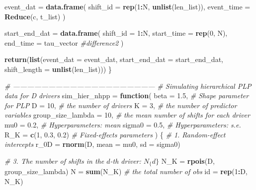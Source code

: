 \documentclass[
]{article}
\newenvironment{Shaded}{\begin{snugshade}}{\end{snugshade}}
\newcommand{\CommentTok}[1]{\textcolor[rgb]{0.56,0.35,0.01}{\textit{#1}}}
\newcommand{\ControlFlowTok}[1]{\textcolor[rgb]{0.13,0.29,0.53}{\textbf{#1}}}
\newcommand{\DataTypeTok}[1]{\textcolor[rgb]{0.13,0.29,0.53}{#1}}
\newcommand{\DecValTok}[1]{\textcolor[rgb]{0.00,0.00,0.81}{#1}}
\newcommand{\FloatTok}[1]{\textcolor[rgb]{0.00,0.00,0.81}{#1}}
\newcommand{\KeywordTok}[1]{\textcolor[rgb]{0.13,0.29,0.53}{\textbf{#1}}}
\newcommand{\NormalTok}[1]{#1}
\newcommand{\OperatorTok}[1]{\textcolor[rgb]{0.81,0.36,0.00}{\textbf{#1}}}
\newcommand{\StringTok}[1]{\textcolor[rgb]{0.31,0.60,0.02}{#1}}
\begin{document}
\begin{Shaded}
\begin{Highlighting}[]
\NormalTok{  event_dat =}\StringTok{ }\KeywordTok{data.frame}\NormalTok{(}
    \DataTypeTok{shift_id =} \KeywordTok{rep}\NormalTok{(}\DecValTok{1}\OperatorTok{:}\NormalTok{N, }\KeywordTok{unlist}\NormalTok{(len_list)),}
    \DataTypeTok{event_time =} \KeywordTok{Reduce}\NormalTok{(c, t_list)}
\NormalTok{  )}

\NormalTok{  start_end_dat =}\StringTok{ }\KeywordTok{data.frame}\NormalTok{(}
    \DataTypeTok{shift_id =} \DecValTok{1}\OperatorTok{:}\NormalTok{N,}
    \DataTypeTok{start_time =} \KeywordTok{rep}\NormalTok{(}\DecValTok{0}\NormalTok{, N),}
    \DataTypeTok{end_time =}\NormalTok{ tau_vector }\CommentTok{#difference2}
\NormalTok{  )}

  \KeywordTok{return}\NormalTok{(}\KeywordTok{list}\NormalTok{(}\DataTypeTok{event_dat =}\NormalTok{ event_dat,}
              \DataTypeTok{start_end_dat =}\NormalTok{ start_end_dat,}
              \DataTypeTok{shift_length =} \KeywordTok{unlist}\NormalTok{(len_list)))}
\NormalTok{\}}

\CommentTok{# ------------------------------------------------------------}
\CommentTok{# Simulating hierarchical PLP data for D drivers}
\NormalTok{sim_hier_nhpp =}\StringTok{ }\ControlFlowTok{function}\NormalTok{(}
  \DataTypeTok{beta =} \FloatTok{1.5}\NormalTok{,             }\CommentTok{# Shape parameter for PLP}
  \DataTypeTok{D =} \DecValTok{10}\NormalTok{,                 }\CommentTok{# the number of drivers}
  \DataTypeTok{K =} \DecValTok{3}\NormalTok{,                  }\CommentTok{# the number of predictor variables}
  \DataTypeTok{group_size_lambda =} \DecValTok{10}\NormalTok{, }\CommentTok{# the mean number of shifts for each driver}
  \DataTypeTok{mu0 =} \FloatTok{0.2}\NormalTok{,              }\CommentTok{# Hyperparameters: mean}
  \DataTypeTok{sigma0 =} \FloatTok{0.5}\NormalTok{,           }\CommentTok{# Hyperparameters: s.e.}
  \DataTypeTok{R_K =} \KeywordTok{c}\NormalTok{(}\DecValTok{1}\NormalTok{, }\FloatTok{0.3}\NormalTok{, }\FloatTok{0.2}\NormalTok{)    }\CommentTok{# Fixed-effects parameters}
\NormalTok{)}
\NormalTok{\{}
  \CommentTok{# 1. Random-effect intercepts}
\NormalTok{  r_0D =}\StringTok{ }\KeywordTok{rnorm}\NormalTok{(D, }\DataTypeTok{mean =}\NormalTok{ mu0, }\DataTypeTok{sd =}\NormalTok{ sigma0)}

  \CommentTok{# 3. The number of shifts in the $d$-th driver: $N_\{d\}$}
\NormalTok{  N_K =}\StringTok{ }\KeywordTok{rpois}\NormalTok{(D, group_size_lambda)}
\NormalTok{  N =}\StringTok{ }\KeywordTok{sum}\NormalTok{(N_K) }\CommentTok{# the total number of obs}
\NormalTok{  id =}\StringTok{ }\KeywordTok{rep}\NormalTok{(}\DecValTok{1}\OperatorTok{:}\NormalTok{D, N_K)}


\end{Highlighting}
\end{Shaded}
\end{document}
